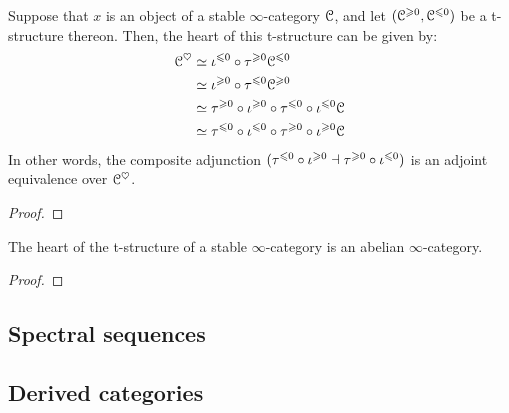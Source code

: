             \begin{corollary} \label{coro: short_exact_sequences_and_truncations}
                Suppose that $x$ is an object of a stable $\infty$-category $\mathcal{C}$, and let $(\mathcal{C}^{\geqslant 0}, \mathcal{C}^{\leqslant 0})$ be a t-structure thereon. Then, the heart of this t-structure can be given by:
                    $$
                        \begin{aligned}
                            \mathcal{C}^{\heartsuit} & \simeq \iota^{\leqslant 0} \circ \tau^{\geqslant 0} \mathcal{C}^{\leqslant 0}
                            \\
                            & \simeq \iota^{\geqslant 0} \circ \tau^{\leqslant 0} \mathcal{C}^{\geqslant 0} 
                            \\
                            & \simeq \tau^{\geqslant 0} \circ \iota^{\geqslant 0} \circ \tau^{\leqslant 0} \circ \iota^{\leqslant 0} \mathcal{C} 
                            \\
                            & \simeq \tau^{\leqslant 0} \circ \iota^{\leqslant 0} \circ \tau^{\geqslant 0} \circ \iota^{\geqslant 0} \mathcal{C}
                        \end{aligned}
                    $$
                In other words, the composite adjunction $(\tau^{\leqslant 0} \circ \iota^{\geqslant 0} \dashv \tau^{\geqslant 0} \circ \iota^{\leqslant 0})$ is an adjoint equivalence over $\mathcal{C}^{\heartsuit}$. 
            \end{corollary}
                \begin{proof}
                    
                \end{proof}
            
            \begin{theorem} \label{theorem: hearts_are_abelian} 
                The heart of the t-structure of a stable $\infty$-category is an abelian $\infty$-category.
            \end{theorem}
                \begin{proof}
                    
                \end{proof}
                
        \subsection{Spectral sequences}

        \subsection{Derived categories}
    
    \printbibliography

